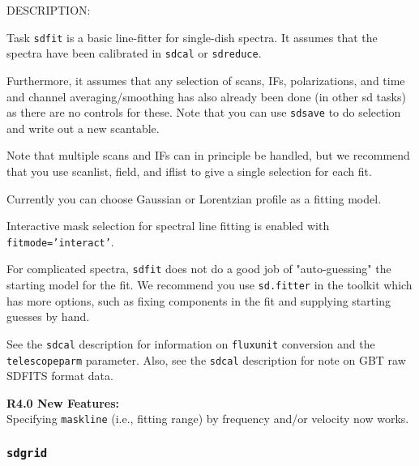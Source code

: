 DESCRIPTION:

Task {\tt sdfit} is a basic line-fitter for single-dish spectra.
It assumes that the spectra have been calibrated in {\tt sdcal}
or {\tt sdreduce}.

Furthermore, it assumes that any selection of scans, IFs,
polarizations, and time and channel averaging/smoothing has
also already been done (in other sd tasks) as there are no controls
for these.  Note that you can use {\tt sdsave} to do selection and write
out a new scantable.

Note that multiple scans and IFs can in principle be handled, but
we recommend that you use scanlist, field, and iflist to give a
single selection for each fit.

Currently you can choose Gaussian or Lorentzian profile as a fitting model.
    
Interactive mask selection for spectral line fitting is enabled with
{\tt fitmode='interact'}. 
    
For complicated spectra, {\tt sdfit} does not do a good job of
"auto-guessing" the starting model for the fit.  We recommend
you use {\tt sd.fitter} in the toolkit which has more options, such
as fixing components in the fit and supplying starting guesses
by hand.

See the {\tt sdcal} description for information on {\tt fluxunit} 
conversion and the {\tt telescopeparm} parameter.
Also, see the {\tt sdcal} description for note on GBT raw SDFITS format data.

\medskip
{\bf R4.0 New Features:}\\
Specifying {\tt maskline} (i.e., fitting range) by frequency and/or velocity now works. 


\subsubsection{{\tt sdgrid}}
\label{section::sd.sdtasks.tasks.sdgrid}

